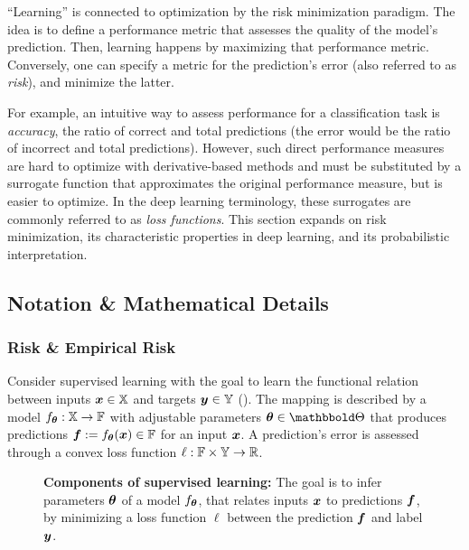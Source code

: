 ``Learning'' is connected to optimization by the risk minimization paradigm. The
idea is to define a performance metric that assesses the quality of the model's
prediction. Then, learning happens by maximizing that performance metric.
Conversely, one can specify a metric for the prediction's error
(also referred to as \emph{risk}), and minimize the latter.


For example, an intuitive way to assess performance for a classification task is
\emph{accuracy}, the ratio of correct and total predictions (the error would be
the ratio of incorrect and total predictions). However, such direct performance
measures are hard to optimize with derivative-based methods and must be substituted by a surrogate function
that approximates the original performance measure, but is easier to optimize.
In the deep learning terminology, these surrogates are commonly referred to as
\emph{loss functions}. This section expands on risk minimization, its
characteristic properties in deep learning, and its probabilistic
interpretation.

\subsection{Notation \& Mathematical
  Details}\label{sec:background::empiricalRiskMinimization}

\subsubsection{Risk \& Empirical Risk}

Consider supervised learning with the goal to learn the functional relation
between inputs ${\bm{x}} \in {\mathbb{X}}$ and targets ${\bm{y}} \in {\mathbb{Y}}$
(). The mapping is described by a
model $f_{{\bm{\theta}}}: {\mathbb{X}} \to {\mathbb{F}}$ with adjustable parameters $\vtheta \in
\sTheta$ that produces predictions ${\bm{f}} := f_{{\bm{\theta}}}({\bm{x}}) \in {\mathbb{F}}$ for an
input ${\bm{x}}$. A prediction's error is assessed through a convex loss function
$\ell: {\mathbb{F}} \times {\mathbb{Y}} \to {\mathbb{R}}$.

\begin{figure}[tb]
  \centering \tikzexternalenable
  \resizebox{!}{3.5cm}{}
  \tikzexternaldisable
  \caption{\textbf{Components of supervised learning:} The goal is to infer
    parameters ${\bm{\theta}}$ of a model $f_{{\bm{\theta}}}$, that relates inputs ${\bm{x}}$ to
    predictions ${\bm{f}}$, by minimizing a loss function $\ell$ between the
    prediction ${\bm{f}}$ and label ${\bm{y}}$.}
  \label{fig:background::ModelLossFunctionSplit}
\end{figure}

